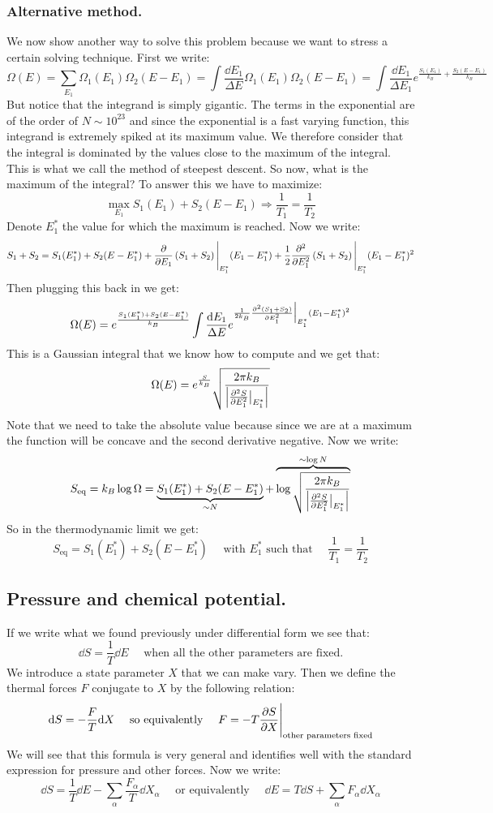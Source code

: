 \documentclass[10pt,a4paper]{book}
\begin{document}
\subsubsection{Alternative method.}
We now show another way to solve this problem because we want to stress a certain solving technique. First we write:
\[
\Omega(E) = \sum_{E_1} \Omega_1(E_1)\Omega_2(E - E_1) = \int \frac{\dd E_1}{\Delta E} \Omega_1(E_1)\Omega_2(E - E_1) = \int \frac{\dd E_1}{\Delta E_1} e^{\frac{S_1(E_1)}{k_B} + \frac{S_2(E - E_1)}{k_B}} 
\]
But notice that the integrand is simply gigantic. The terms in the exponential are of the order of $N \sim 10^{23}$ and since the exponential is a fast varying function, this integrand is extremely spiked at its maximum value. We therefore consider that the integral is dominated by the values close to the maximum of the integral. This is what we call the method of steepest descent. So now, what is the maximum of the integral? To answer this we have to maximize:
\[
\max_{E_1} S_1(E_1) + S_2(E - E_1) \Rightarrow \frac{1}{T_1} = \frac{1}{T_2}
\]
Denote $E_1^*$ the value for which the maximum is reached. Now we write:
\[
S_1 + S_2 = S_1(E_1^*) + S_2(E - E_1^*) + \pdv{}{E_1}\left(S_1 + S_2\right)\Bigg|_{E_1^*} (E_1 - E_1^*) + \frac{1}{2} \pdv[2]{}{E_1} \left(S_1 + S_2\right)\Bigg|_{E_1^*}(E_1 - E_1^*)^2
\]
Then plugging this back in we get:
\[
\Omega(E) = e^{\frac{S_1(E_1^*) + S_2(E - E_1^*)}{k_B}} \int \frac{\dd E_1}{\Delta E} e^{\frac{1}{2k_B} \pdv[2]{(S_1+S_2)}{E_1}\Big|_{E_1^*} (E_1 - E_1^*)^2}
\]
This is a Gaussian integral that we know how to compute and we get that:
\[
\Omega(E) = e^{\frac{S}{k_B}} \sqrt{\frac{2\pi k_B}{\Big| \pdv[2]{S}{E_1}\big|_{E_1^*}\Big |} }
\]
Note that we need to take the absolute value because since we are at a maximum the function will be concave and the second derivative negative. Now we write:
\[
S_\text{eq} = k_B \log \Omega = \underbrace{S_1(E_1^*) + S_2(E - E_1^*)}_{\sim N} + \overbrace{\log \sqrt{\frac{2\pi k_B}{\Big| \pdv[2]{S}{E_1}\big|_{E_1^*}\Big |} }}^{\sim \log N}
\]
So in the thermodynamic limit we get:
\[
S_\text{eq} = S_1(E_1^*) + S_2(E - E_1^*) \quad  \text{ with } E_1^* \text{ such that } \quad \frac{1}{T_1} = \frac{1}{T_2}
\]

\subsection{Pressure and chemical potential.}
If we write what we found previously under differential form we see that:
\[
\dd S = \frac{1}{T} \dd E \quad \text{ when all the other parameters are fixed.}
\]
We introduce a state parameter $X$ that we can make vary. Then we define the thermal forces $F$ conjugate to $X$ by the following relation:
\[
\dd S = - \frac{F}{T} \dd X \quad \text{ so equivalently } \quad F = - T \pdv{S}{X}\Bigg|_{\text{other parameters fixed}}
\]
We will see that this formula is very general and identifies well with the standard expression for pressure and other forces. Now we write:
\[
\dd S = \frac{1}{T} \dd E - \sum_\alpha \frac{F_\alpha}{T} \dd X_\alpha \quad \text{ or equivalently } \quad \dd E = T \dd S + \sum_\alpha F_\alpha \dd X_\alpha
\]
\end{document}
